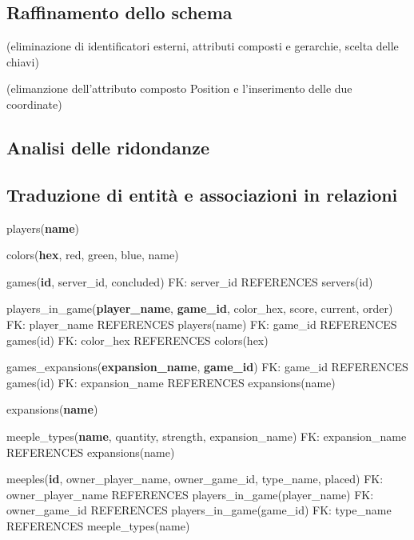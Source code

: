 \subsection{Raffinamento dello schema}
(eliminazione di identificatori esterni, attributi composti e gerarchie, scelta delle chiavi)
\medskip

(elimanzione dell'attributo composto Position e l'inserimento delle due coordinate)

\subsection{Analisi delle ridondanze}

\subsection{Traduzione di entità e associazioni in relazioni}
\hspace{1.5em}players(\textbf{name})\newline

colors(\textbf{hex}, red, green, blue, name)\newline

games(\textbf{id}, server\_id, concluded)\newline
FK: server\_id REFERENCES servers(id)\newline

players\_in\_game(\textbf{player\_name}, \textbf{game\_id}, color\_hex, score, current, order)\newline
FK: player\_name REFERENCES players(name)\newline
FK: game\_id REFERENCES games(id)\newline
FK: color\_hex REFERENCES colors(hex)\newline

games\_expansions(\textbf{expansion\_name}, \textbf{game\_id})\newline
FK: game\_id REFERENCES games(id)\newline
FK: expansion\_name REFERENCES expansions(name)\newline

expansions(\textbf{name})\newline

meeple\_types(\textbf{name}, quantity, strength, expansion\_name)\newline
FK: expansion\_name REFERENCES expansions(name)\newline

meeples(\textbf{id}, owner\_player\_name, owner\_game\_id, type\_name, placed)\newline
FK: owner\_player\_name REFERENCES players\_in\_game(player\_name)\newline
FK: owner\_game\_id REFERENCES players\_in\_game(game\_id)\newline
FK: type\_name REFERENCES meeple\_types(name)\newline

